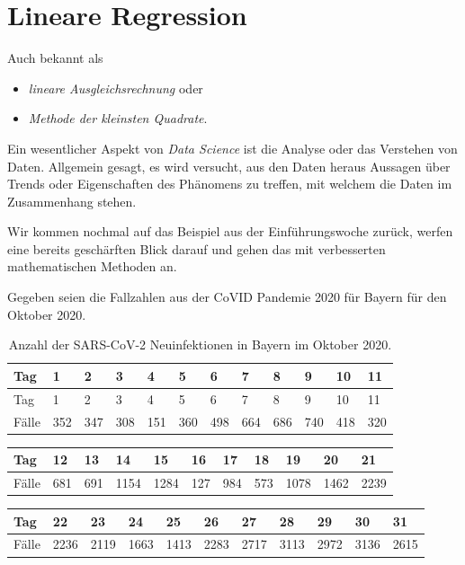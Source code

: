 \documentclass[]{book}
\providecommand{\tightlist}{%
  \setlength{\itemsep}{0pt}\setlength{\parskip}{0pt}}
\theoremstyle{definition}
\theoremstyle{definition}
\theoremstyle{definition}
\theoremstyle{definition}
\theoremstyle{remark}
\begin{document}
\hypertarget{sec-lineare-regression}{%
\chapter{Lineare Regression}\label{sec-lineare-regression}}

Auch bekannt als

\begin{itemize}
\tightlist
\item
  \emph{lineare Ausgleichsrechnung} oder
\item
  \emph{Methode der kleinsten Quadrate}.
\end{itemize}

Ein wesentlicher Aspekt von \emph{Data Science} ist die Analyse oder das
Verstehen von Daten. Allgemein gesagt, es wird versucht, aus den Daten
heraus Aussagen über Trends oder Eigenschaften des Phänomens zu treffen,
mit welchem die Daten im Zusammenhang stehen.

Wir kommen nochmal auf das Beispiel aus der Einführungswoche zurück, werfen eine bereits geschärften Blick darauf und gehen das mit verbesserten mathematischen Methoden an.

Gegeben seien die Fallzahlen aus der CoVID Pandemie 2020 für Bayern für den Oktober 2020.

\hypertarget{tab:covid-cases}{}
\begin{longtable}[]{@{}llllllllllll@{}}
\caption{Anzahl der SARS-CoV-2 Neuinfektionen in Bayern im Oktober 2020.}\tabularnewline
\toprule
Tag & 1 & 2 & 3 & 4 & 5 & 6 & 7 & 8 & 9 & 10 & 11\tabularnewline
\midrule
\endfirsthead
\toprule
Tag & 1 & 2 & 3 & 4 & 5 & 6 & 7 & 8 & 9 & 10 & 11\tabularnewline
\midrule
\endhead
Fälle & 352 & 347 & 308 & 151 & 360 & 498 & 664 & 686 & 740 & 418 & 320\tabularnewline
\bottomrule
\end{longtable}

\begin{longtable}[]{@{}lllllllllll@{}}
\toprule
Tag & 12 & 13 & 14 & 15 & 16 & 17 & 18 & 19 & 20 & 21\tabularnewline
\midrule
\endhead
Fälle & 681 & 691 & 1154 & 1284 & 127 & 984 & 573 & 1078 & 1462 & 2239\tabularnewline
\bottomrule
\end{longtable}

\begin{longtable}[]{@{}lllllllllll@{}}
\toprule
Tag & 22 & 23 & 24 & 25 & 26 & 27 & 28 & 29 & 30 & 31\tabularnewline
\midrule
\endhead
Fälle & 2236 & 2119 & 1663 & 1413 & 2283 & 2717 & 3113 & 2972 & 3136 & 2615\tabularnewline
\bottomrule
\end{longtable}
\end{document}
